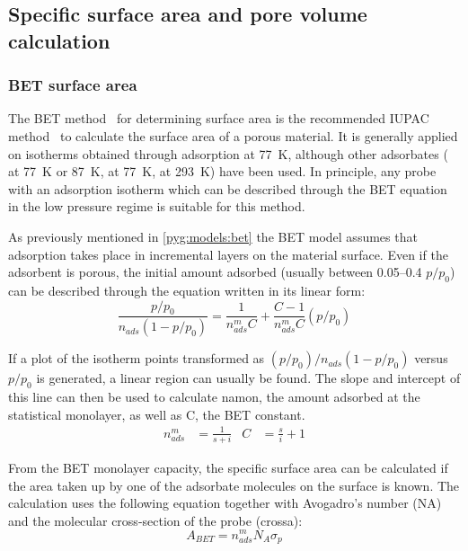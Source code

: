 
\subsection{Specific surface area and pore volume calculation}

\subsubsection{BET surface area}\label{pyg:charac:betarea}

The \gls{BET} method~\cite{brunauerAdsorptionGasesMultimolecular1938}
for determining surface area is the recommended \gls{IUPAC}
method~\cite{thommesPhysisorptionGasesSpecial2015}
to calculate the surface area of a porous material.
It is generally applied on isotherms obtained through 
adsorption at \SI{77}{\kelvin}, although other adsorbates
( at \SI{77}{\kelvin} or \SI{87}{\kelvin},
 at \SI{77}{\kelvin},  at \SI{293}{\kelvin})
have been used. In principle, any probe with an adsorption isotherm
which can be described through the \gls{BET} equation in the low pressure regime
is suitable for this method.

As previously mentioned in \autoref{pyg:models:bet} the \gls{BET} model assumes
that adsorption takes place in incremental layers on the material
surface. Even if the adsorbent is porous, the initial amount adsorbed
(usually between 0.05--0.4 \(p/p_0\)) can be
described through the equation written in its linear form:
%
\begin{equation}
	\frac{p/p_0}{n_{ads} (1-p/p_0)} = \frac{1}{n_{ads}^m C} + \frac{C - 1}{n_{ads}^m C}(p/p_0)
\end{equation}

If a plot of the isotherm points transformed as \({(p/p_0)}/{n_{ads}(1-p/p_0)}\)
versus \(p/p_0\) is generated, a linear region
can usually be found. The slope and intercept of this line
can then be used to calculate \gls{namon}, the amount adsorbed at the
statistical monolayer, as well as \gls{C}, the \gls{BET} constant.
%
\begin{align}
	n_{ads}^{m} & = \frac{1}{s+i} & C & = \frac{s}{i} + 1
\end{align}

From the \gls{BET} monolayer capacity, the specific surface area can be
calculated if the area taken up by one of the adsorbate molecules
on the surface is known. The calculation uses the following equation
together with Avogadro's number (\gls{NA}) and the molecular cross-section 
of the probe (\gls{crossa}):
%
\begin{equation}
	A_{BET} = n_{ads}^m N_A \sigma_p
\end{equation}

